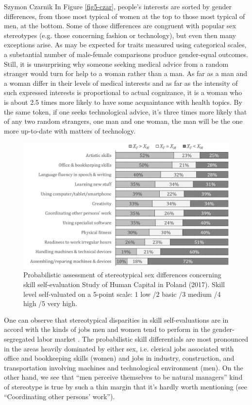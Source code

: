 \begin{artengenv}{Szymon Czarnik}
In Figure \ref{fig5-czar}, people's interests are sorted by gender differences, from those most typical of women at the top to those most typical of men, at the bottom. Some of those differences are congruent with popular sex stereotypes (e.g. those concerning fashion or technology), but even then many exceptions arise. As may be expected for traits measured using categorical scales, a substantial number of male-female comparisons produce gender-equal outcomes. Still, it is unsurprising why someone seeking medical advice from a random stranger would turn for help to a woman rather than a man. As far as a man and a woman differ in their levels of medical interests and as far as the intensity of such expressed interests is proportional to actual cognizance, it is a woman who is about 2.5 times more likely to have some acquaintance with health topics. By the same token, if one seeks technological advice, it's three times more likely that of any two random strangers, one man and one woman, the man will be the one more up-to-date with matters of technology.

\begin{figure}[h]
	\centering
   \includegraphics[width=\textwidth]{ART_Czarnik/Czarnik-img022.jpg}
\caption{Probabilistic assessment of stereotypical sex differences concerning skill self-evaluation Study of Human Capital in Poland (2017). Skill level self-valuated on a 5-point scale: 1 low /2 basic /3 medium /4 high /5 very high.}\label{fig6-czar}
\end{figure}

One can observe that stereotypical disparities in skill self-evaluations are in accord with the kinds of jobs men and women tend to perform in the gender-segregated labor market
\parencite[][]{czarnik_gender_2015}. %
 The probabilistic skill differentials are most pronounced in the areas heavily dominated by either sex, i.e. clerical jobs associated with office and bookkeeping skills (women) and jobs in industry, construction, and transportation involving machines and technological environment (men). On the other hand, we see that ``men perceive themselves to be natural managers'' kind of stereotype is true by such a thin margin that it's hardly worth mentioning (see ``Coordinating other persons' work'').


\end{artengenv}
